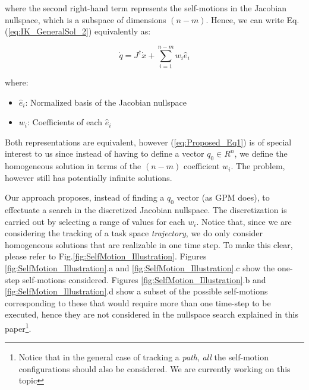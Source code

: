 \documentclass[conference]{IEEEtran}
\newcommand{\Jps}{\ensuremath{J^{\dagger}}}
\newcommand{\dx}{\ensuremath{\dot{x}}}
\newcommand{\dq}{\ensuremath{\dot{q}}}
\newcommand{\q}{\ensuremath{q}}
\newcommand{\nsb}{\ensuremath{\hat{e}}} %
\newcommand{\nsc}{\ensuremath{w}}  %
\begin{document}
where the second right-hand term represents the self-motions in the Jacobian nullspace, which is a
subspace of dimensions $(n-m)$. Hence, we can write Eq.(\ref{eq:IK_GeneralSol_2}) equivalently as:

\begin{equation}
\dq = \Jps \dx + \displaystyle \sum_{i=1}^{n-m} \nsc_{i}\nsb_{i}
\label{eq:Proposed_Eq1}
\end{equation}

where:
\begin{itemize}
\item{ $\nsb_{i}$: Normalized basis of the Jacobian nullspace}
\item{$\nsc_{i}$: Coefficients of each $\nsb_{i}$}
\end{itemize}

Both representations are equivalent, however (\ref{eq:Proposed_Eq1}) is of special interest to us since
instead of having to define a vector $\q_{0} \in R^{n}$, we define the homogeneous solution in terms of 
the $(n-m)$ coefficient $\nsc_{i}$. The problem, however still has potentially infinite solutions.

Our approach proposes, instead of finding a $\q_{0}$ vector (as GPM does), to effectuate a 
search in the discretized Jacobian nullspace. The discretization is carried out by selecting a range of
values for each $\nsc_{i}$. Notice that, since we are considering the tracking of a task space \textit{trajectory}, 
we do only consider homogeneous solutions that are realizable in one time step. To make this clear, please refer 
to Fig.\ref{fig:SelfMotion_Illustration}. Figures \ref{fig:SelfMotion_Illustration}.a and 
\ref{fig:SelfMotion_Illustration}.c show the one-step self-motions considered. Figures \ref{fig:SelfMotion_Illustration}.b 
and \ref{fig:SelfMotion_Illustration}.d show a subset of the possible self-motions corresponding to these 
that would require more than one time-step to be executed, hence they are not considered in 
the nullspace search explained in this paper\footnote{Notice that in the
general case of tracking a \textit{path}, \textit{all} the self-motion configurations should also be considered. We
are currently working on this topic}.     
\end{document}
